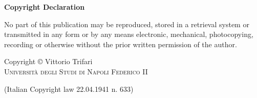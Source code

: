 %
%
%
%


\thispagestyle{empty}
\vspace*{\fill}
{
\begin{center}
{\bf Copyright Declaration}
\end{center}

\centering
\begin{minipage}{0.85\textwidth}
No part of this publication may be reproduced, stored in a retrieval system or transmitted in any form or by any means electronic, mechanical, photocopying, recording or otherwise without the prior written permission of the author.
\end{minipage}

\bigskip

\centering Copyright © Vittorio Trifari\\
\textsc{Università degli Studi di Napoli Federico II}

\medskip
\hfil (Italian Copyright law 22.04.1941 n. 633)
}%
